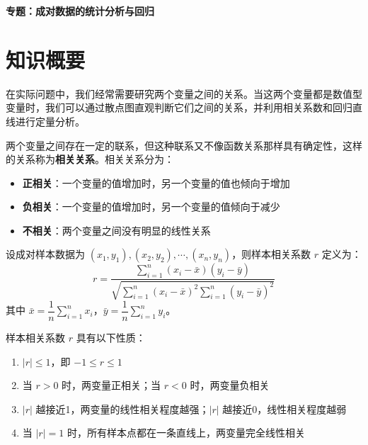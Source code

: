 \documentclass[11pt]{ctexrep}
\begin{document}
\begin{center}
    {\LARGE\bfseries 专题：成对数据的统计分析与回归}
\end{center}

\section*{知识概要}

在实际问题中，我们经常需要研究两个变量之间的关系。当这两个变量都是数值型变量时，我们可以通过散点图直观判断它们之间的关系，并利用相关系数和回归直线进行定量分析。

\begin{definition}[相关关系]
    两个变量之间存在一定的联系，但这种联系又不像函数关系那样具有确定性，这样的关系称为\textbf{相关关系}。相关关系分为：
    \begin{itemize}
        \item \textbf{正相关}：一个变量的值增加时，另一个变量的值也倾向于增加
        \item \textbf{负相关}：一个变量的值增加时，另一个变量的值倾向于减少
        \item \textbf{不相关}：两个变量之间没有明显的线性关系
    \end{itemize}
\end{definition}

\begin{definition}[样本相关系数]
    设成对样本数据为 $(x_1, y_1), (x_2, y_2), \cdots, (x_n, y_n)$，则样本相关系数 $r$ 定义为：
    \[
        r = \frac{\sum_{i=1}^{n}(x_i - \bar{x})(y_i - \bar{y})}{\sqrt{\sum_{i=1}^{n}(x_i - \bar{x})^2 \sum_{i=1}^{n}(y_i - \bar{y})^2}}
    \]
    其中 $\bar{x} = \dfrac{1}{n}\sum_{i=1}^{n}x_i$，$\bar{y} = \dfrac{1}{n}\sum_{i=1}^{n}y_i$。
\end{definition}

\begin{property}[相关系数的性质]
    样本相关系数 $r$ 具有以下性质：
    \begin{enumerate}
        \item $|r| \le 1$，即 $-1 \le r \le 1$
        \item 当 $r > 0$ 时，两变量正相关；当 $r < 0$ 时，两变量负相关
        \item $|r|$ 越接近1，两变量的线性相关程度越强；$|r|$ 越接近0，线性相关程度越弱
        \item 当 $|r| = 1$ 时，所有样本点都在一条直线上，两变量完全线性相关
    \end{enumerate}
\end{property}
\end{document}
